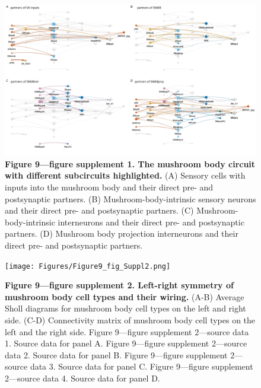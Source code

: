 \documentclass[
  11pt,
]{article}
\begin{document}
\begin{figure}[H]

{\centering \includegraphics[width=1\textwidth,height=\textheight]{Figures/Figure9_fig_suppl1.png}

}

\caption{\textbf{Figure 9---figure supplement 1. The mushroom body
circuit with different subcircuits highlighted.} (A) Sensory cells with
inputs into the mushroom body and their direct pre- and postsynaptic
partners. (B) Mushroom-body-intrinsic sensory neurons and their direct
pre- and postsynaptic partners. (C) Mushroom-body-intrinsic interneurons
and their direct pre- and postsynaptic partners. (D) Mushroom body
projection interneurons and their direct pre- and postsynaptic
partners.}

\end{figure}%

\begin{figure}[H]

{\centering \texttt{[image: Figures/Figure9\_fig\_Suppl2.png]}

}

\caption{\textbf{Figure 9---figure supplement 2. Left-right symmetry of
mushroom body cell types and their wiring.} (A-B) Average Sholl diagrams
for mushroom body cell types on the left and right side. (C-D)
Connectivity matrix of mushroom body cell types on the left and the
right side. Figure 9---figure supplement 2---source data 1. Source data
for panel A. Figure 9---figure supplement 2---source data 2. Source data
for panel B. Figure 9---figure supplement 2---source data 3. Source data
for panel C. Figure 9---figure supplement 2---source data 4. Source data
for panel D.}

\end{figure}%
\end{document}
